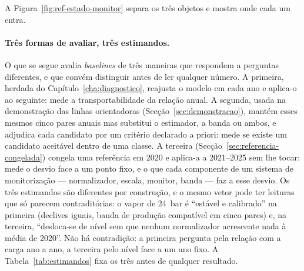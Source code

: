 A Figura~\ref{fig:ref-estado-monitor} separa os três objetos e mostra onde cada um entra.


\paragraph{Três formas de avaliar, três estimandos.} O que se segue avalia
\emph{baselines} de três maneiras que respondem a perguntas diferentes, e
que convém distinguir antes de ler qualquer número. A primeira, herdada do
Capítulo~\ref{cha:diagnostico}, reajusta o modelo em cada ano e aplica-o ao
seguinte: mede a transportabilidade da relação anual. A segunda, usada na
demonstração das linhas orientadoras (Secção~\ref{sec:demonstracao}),
mantém esses mesmos cinco pares anuais mas substitui o estimador, a banda ou
ambos, e adjudica cada candidato por um critério declarado a priori: mede se
existe um candidato aceitável dentro de uma classe. A terceira
(Secção~\ref{sec:referencia-congelada}) congela uma referência em 2020 e
aplica-a a 2021--2025 sem lhe tocar: mede o desvio face a um ponto fixo, e o
que cada componente de um sistema de monitorização --- normalizador,
escala, monitor, banda --- faz a esse desvio. Os três estimandos são
diferentes por construção, e o mesmo vetor pode ter leituras que só parecem
contraditórias: o vapor de 24~bar é ``estável e calibrado'' na primeira
(declives iguais, banda de produção compatível em cinco pares) e, na
terceira, ``desloca-se de nível sem que nenhum normalizador acrescente nada
à média de 2020''. Não há contradição: a primeira pergunta pela relação com
a carga ano a ano, a terceira pelo nível face a um ano fixo. A
Tabela~\ref{tab:estimandos} fixa os três antes de qualquer resultado.


